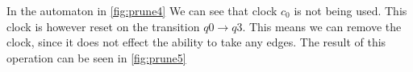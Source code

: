 

In the automaton in \cref{fig:prune4}
We can see that clock $c_0$ is not being used.
This clock is however reset on the transition $q0\rightarrow q3$.
This means we can remove the clock, since it does not effect the ability to take any edges.
The result of this operation can be seen in \cref{fig:prune5}

